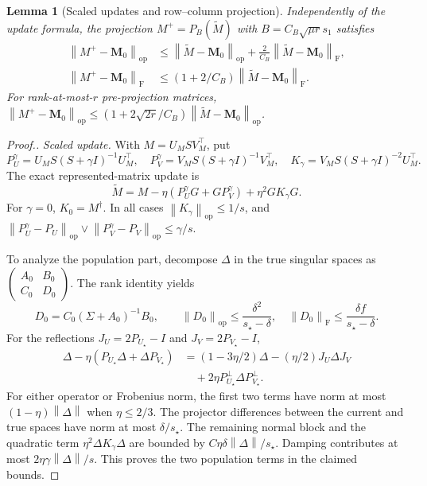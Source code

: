 \documentclass[numsec,webpdf,modern,large,namedate]{oup-authoring-template}
\theoremstyle{plain}
\newtheorem{slemma}{Lemma}%
\theoremstyle{remark}
\newcommand{\M}{\bm{M}}
\providecommand{\op}{\mathrm{op}}
\providecommand{\F}{\mathrm{F}}
\providecommand{\norm}[1]{\left\|#1\right\|}
\newif\ifmarkchanges
\newenvironment{revision}{\begingroup\ifmarkchanges\color{red}\fi}{\endgroup}
\begin{document}
\begin{revision}
\begin{slemma}[Scaled updates and row--column projection]
Independently of the update formula, the projection
$M^+=P_B(\widetilde M)$ with $B=C_B\sqrt{\mu r}s_1$ satisfies
\begin{align}
 \norm{M^+-\M_0}_\op&\le
 \norm{\widetilde M-\M_0}_\op+
 \frac{2}{C_B}\norm{\widetilde M-\M_0}_\F,\label{eq:recovery_projectionop}\\
 \norm{M^+-\M_0}_\F&\le
 (1+2/C_B)\norm{\widetilde M-\M_0}_\F.\label{eq:recovery_projectionF}
\end{align}
For rank-at-most-$r$ pre-projection matrices,
$\norm{M^+-\M_0}_\op\le(1+2\sqrt{2r}/C_B)
\norm{\widetilde M-\M_0}_\op$.
\end{slemma}
\begin{proof}[Proof.]
\textit{Scaled update.} With $M=U_M S V_M^\top$, put
\[
 P_U^\gamma=U_M S(S+\gamma I)^{-1}U_M^\top,\quad
 P_V^\gamma=V_M S(S+\gamma I)^{-1}V_M^\top,
 \quad K_\gamma=V_M S(S+\gamma I)^{-2}U_M^\top.
\]
The exact represented-matrix update is
\begin{equation}
 \widetilde M=M-\eta(P_U^\gamma G+G P_V^\gamma)
 +\eta^2 G K_\gamma G.\label{eq:recovery_exact-matrix}
\end{equation}
For $\gamma=0$, $K_0=M^\dagger$.
In all cases $\norm{K_\gamma}_\op\le1/s$, and
$\norm{P_U^\gamma-P_U}_\op\vee\norm{P_V^\gamma-P_V}_\op\le\gamma/s$.

To analyze the population part, decompose $\Delta$ in the true singular
spaces as $\left(\begin{smallmatrix}A_0&B_0\\C_0&D_0\end{smallmatrix}\right)$.
The rank identity yields
\[
 D_0=C_0(\Sigma+A_0)^{-1}B_0,\qquad
 \norm{D_0}_\op\le\frac{\delta^2}{s_\star-\delta},\quad
 \norm{D_0}_\F\le\frac{\delta f}{s_\star-\delta}.
\]
For the reflections $J_U=2P_{U_\star}-I$ and $J_V=2P_{V_\star}-I$,
\begin{align*}
 \Delta-\eta(P_{U_\star}\Delta+\Delta P_{V_\star})
 &=(1-3\eta/2)\Delta-(\eta/2)J_U\Delta J_V\\
 &\quad+2\eta P_{U_\star}^\perp\Delta P_{V_\star}^\perp.
\end{align*}
For either operator or Frobenius norm, the first two terms have norm at most
$(1-\eta)\norm{\Delta}$ when $\eta\le2/3$.
The projector differences between the current and true spaces have norm at
most $\delta/s_\star$.  The remaining normal block and the quadratic term
$\eta^2\Delta K_\gamma\Delta$ are bounded by
$C\eta\delta\norm{\Delta}/s_\star$.
Damping contributes at most $2\eta\gamma\norm{\Delta}/s$.
This proves the two population terms in the claimed bounds.


\end{proof}
\end{revision}
\end{document}
